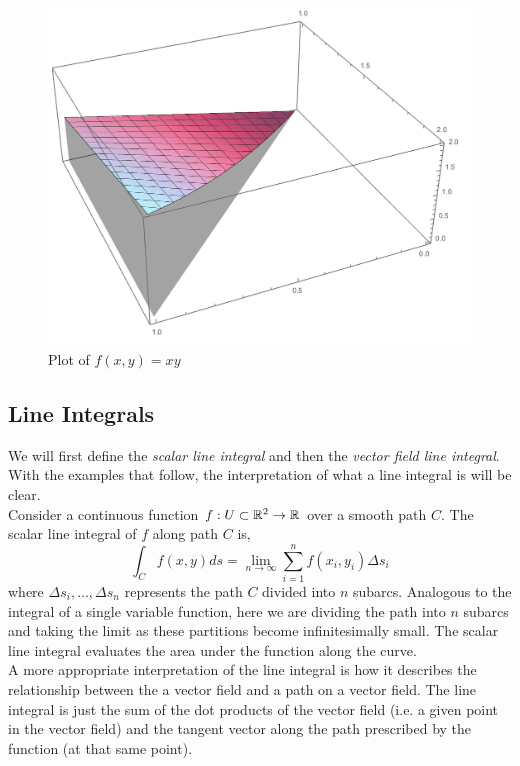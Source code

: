\documentclass[12pt]{article}
\begin{document}
\begin{figure}[H]
\centering
\caption{Plot of $f(x,y) = xy$}
\label{fig:iteratedintegralexample}
\indent\includegraphics[scale=0.5]{iterated_integral_example.png}
\end{figure}

\subsection{Line Integrals}

 We will first define the \emph{scalar line integral} and then the \emph{vector field line integral}. With the examples that follow, the interpretation of what a line integral is will be clear.  \\

 Consider a continuous function $f:U\subset\mathbb{R}^2\rightarrow\mathbb{R}$ over a smooth path $C$. The scalar line integral of $f$ along path $C$ is,
\[
\int_C f(x,y) ds = \lim_{n\rightarrow\infty} \sum_{i=1}^n f(x_i,y_i) \Delta s_i
\]
where $\Delta s_i,\ldots,\Delta s_n$ represents the path $C$ divided into $n$ subarcs. Analogous to the integral of a single variable function, here we are dividing the path into $n$ subarcs and taking the limit as these partitions become infinitesimally small. The scalar line integral evaluates the area under the function along the curve. \\ 

 A more appropriate interpretation of the line integral is how it describes the relationship between the a vector field and a path on a vector field. The line integral is just the sum of the dot products of the vector field (i.e. a given point in the vector field) and the tangent vector along the path prescribed by the function (at that same point). \\
\end{document}
